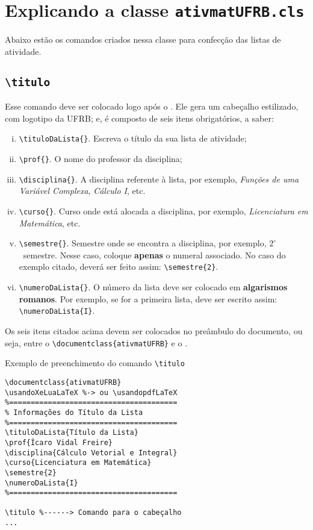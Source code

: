 \section{Explicando a classe \texttt{ativmatUFRB.cls}}

Abaixo estão os comandos criados nessa classe para confecção das listas de 
atividade.

\subsection{\texttt{\textbackslash titulo}}
Esse comando deve ser colocado logo após o \verb||.
Ele gera um cabeçalho estilizado, com logotipo da UFRB; e, é composto de seis 
itens obrigatórios, a saber:
\begin{enumerate}[(i)]
 \item \verb|\tituloDaLista{}|. Escreva o título da sua lista de atividade;
 \item \verb|\prof{}|. O nome do professor da disciplina;
 \item \verb|\disciplina{}|. A disciplina referente à lista, por exemplo,
  \emph{Funções de uma Variável Complexa}, \emph{Cálculo I}, etc.
 \item \verb|\curso{}|.  Curso onde está alocada a disciplina, por exemplo,
  \emph{Licenciatura em Matemática}, etc.
 \item \verb|\semestre{}|. Semestre onde se encontra a disciplina, por exemplo,
  $2^{\circ}$~semestre. Nesse caso, coloque \textbf{apenas} o numeral associado.
  No caso do exemplo citado, deverá ser feito assim: \verb|\semestre{2}|.
 \item \verb|\numeroDaLista{}|. O número da lista deve ser colocado em 
  \textbf{algarismos romanos}. 
  Por exemplo, se for a primeira lista, deve ser escrito assim:
  \verb|\numeroDaLista{I}|.
\end{enumerate}

Os seis itens citados acima devem ser colocados no preâmbulo do documento, ou
seja, entre o \verb|\documentclass{ativmatUFRB}| e o \verb||.

\begin{codbox}{Exemplo de preenchimento do comando \texttt{\textbackslash titulo}}
\begin{verbatim}
\documentclass{ativmatUFRB}
\usandoXeLuaLaTeX %-> ou \usandopdfLaTeX
%=======================================
% Informações do Título da Lista
%=======================================
\tituloDaLista{Título da Lista}
\prof{Ícaro Vidal Freire}
\disciplina{Cálculo Vetorial e Integral}
\curso{Licenciatura em Matemática}
\semestre{2}
\numeroDaLista{I}
%=======================================

\titulo %------> Comando para o cabeçalho
...

\end{verbatim}
\end{codbox}


